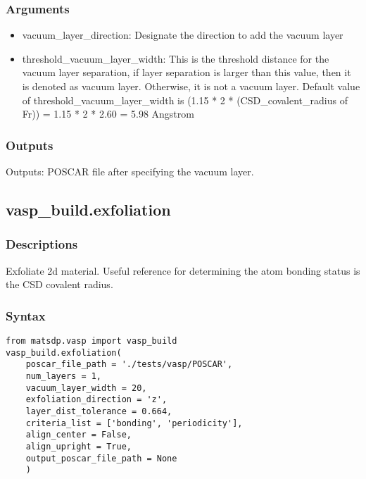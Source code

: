 \documentclass[12pt]{book}
\begin{document}
\subsubsection{Arguments}
\begin{itemize}
\item vacuum\_layer\_direction: Designate the direction to add the vacuum layer
\item threshold\_vacuum\_layer\_width: This is the threshold distance for the vacuum layer separation, if layer separation is larger than this value, then it is denoted as vacuum layer. Otherwise, it is not a vacuum layer. Default value of threshold\_vacuum\_layer\_width is (1.15 * 2 * (CSD\_covalent\_radius of Fr)) = 1.15 * 2 * 2.60 = 5.98 Angstrom
\end{itemize}

\subsubsection{Outputs}
Outputs: POSCAR file after specifying the vacuum layer.


\subsection{vasp\_build.exfoliation}
\subsubsection{Descriptions}
Exfoliate 2d material. Useful reference for determining the atom bonding status is the CSD covalent radius\cite{Cordero2008DTNone}.
\subsubsection{Syntax}
\begin{lstlisting}
from matsdp.vasp import vasp_build
vasp_build.exfoliation(
    poscar_file_path = './tests/vasp/POSCAR', 
    num_layers = 1, 
    vacuum_layer_width = 20, 
    exfoliation_direction = 'z', 
    layer_dist_tolerance = 0.664, 
    criteria_list = ['bonding', 'periodicity'], 
    align_center = False, 
    align_upright = True, 
    output_poscar_file_path = None
    )
\end{lstlisting}
\end{document}
